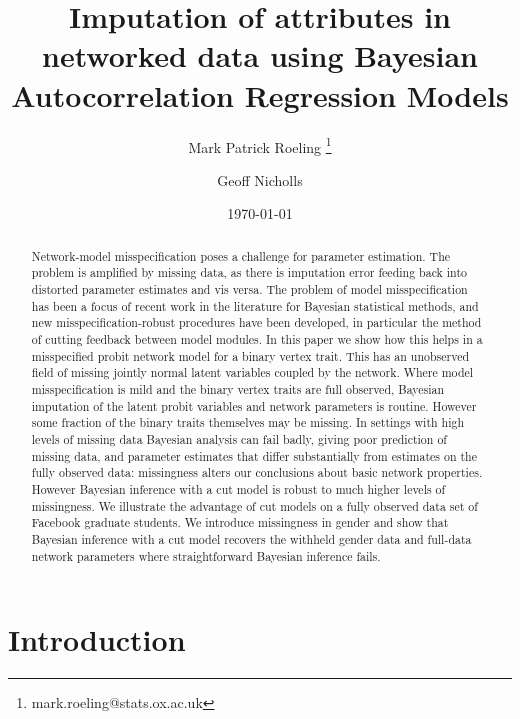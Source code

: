 \documentclass{article}
\begin{document}
\title{Imputation of attributes in networked data using Bayesian Autocorrelation Regression Models}
\author[12]{Mark Patrick Roeling \thanks{mark.roeling@stats.ox.ac.uk}}
\author[1]{Geoff Nicholls}
\date{\today}
\maketitle
	
\newpage
\begin{abstract}
Network-model misspecification poses a challenge for parameter estimation. The problem is amplified by missing data, as there is imputation error feeding back into distorted parameter estimates and vis versa. The problem of model misspecification has been a focus of recent work in the literature for Bayesian statistical methods, and new misspecification-robust procedures have been developed, in particular the method of cutting feedback between model modules. %
In this paper we show how this helps in a misspecified probit network model for a binary vertex trait. This has an unobserved field of missing jointly normal latent variables coupled by the network. Where model misspecification is mild and the binary vertex traits are full observed, Bayesian imputation of the latent probit variables and network parameters is routine. However some fraction of the binary traits themselves may be missing. In settings with high levels of missing data Bayesian analysis can fail badly, giving poor prediction of missing data, and parameter estimates that differ substantially from estimates on the fully observed data: missingness alters our conclusions about basic network properties. However Bayesian inference with a cut model is robust to much higher levels of missingness. We illustrate the advantage of cut models on a fully observed data set of Facebook graduate students. We introduce missingness in gender and show that Bayesian inference with a cut model recovers the withheld gender data and full-data network parameters where straightforward Bayesian inference fails.
\end{abstract}
\doublespacing
\newpage
\section{Introduction}
\end{document}
